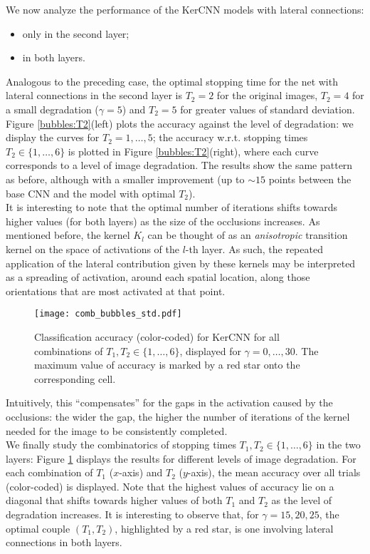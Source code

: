 \documentclass[11pt,oneside,reqno]{amsart}
\begin{document}
 We now analyze the performance of the KerCNN models with lateral connections:
  \begin{itemize}
  \item only in the second layer;
  \item in both layers.
 \end{itemize}
 Analogous to the preceding case, the optimal stopping time for the net with lateral connections in the second layer is $T_2=2$ for the original images, $T_2=4$ for a small degradation ($\gamma=5$) and $T_2=5$ for greater values of standard deviation. Figure \ref{bubbles:T2}(left) plots the accuracy against the level of degradation: we display the curves for $T_2=1,\ldots,5$; the accuracy w.r.t. stopping times $T_2 \in \{1,\ldots,6\}$ is plotted in Figure \ref{bubbles:T2}(right), where each curve corresponds to a level of image degradation. The results show the same pattern as before, although with a smaller improvement (up to $\sim15$ points between the base CNN and the model with optimal $T_2$).\\
 It is interesting to note that the optimal number of iterations shifts towards higher values (for both layers) as the size of the occlusions increases. As mentioned before, the kernel $K_l$ can be thought of as an \emph{anisotropic} transition kernel on the space of activations of the $l$-th layer. As such, the repeated application of the lateral contribution given by these kernels may be interpreted as a spreading of activation, around each spatial location, along those orientations that are most activated at that point. 
 \begin{figure}[htbp!]
  \centering
 \texttt{[image: comb\_bubbles\_std.pdf]}
 \caption{Classification accuracy (color-coded) for KerCNN for all combinations of $T_1, T_2 \in \{1,\ldots,6\}$, displayed for $\gamma=0,\ldots,30$. The maximum value of accuracy is marked by a red star onto the corresponding cell.}\label{comb_bubbles}
 \end{figure}
 Intuitively, this ``compensates'' for the gaps in the activation caused by the occlusions: the wider the gap, the higher the number of iterations of the kernel needed for the image to be consistently completed.\\
 We finally study the combinatorics of stopping times $T_1,T_2 \in \{1,\ldots,6\}$ in the two layers: Figure \ref{comb_bubbles} displays the results for different levels of image degradation. For each combination of $T_1$ ($x$-axis) and $T_2$ ($y$-axis), the mean accuracy over all trials (color-coded) is displayed. Note that the highest values of accuracy lie on a diagonal that shifts towards higher values of both $T_1$ and $T_2$ as the level of degradation increases. It is interesting to observe that, for $\gamma=15,20,25$, the optimal couple $(T_1,T_2)$, highlighted by a red star, is one involving lateral connections in both layers.
 
\end{document}
